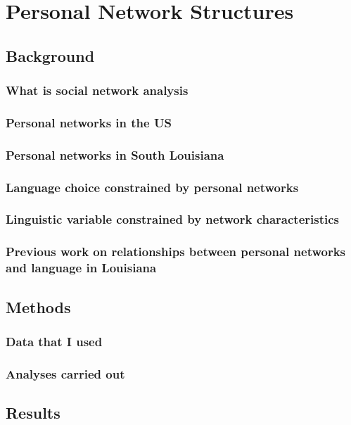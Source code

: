 \chapter{Personal Network Structures}
  \section{Background}
    \subsection{What is social network analysis}
    \subsection{Personal networks in the US}
    \subsection{Personal networks in South Louisiana}
    \subsection{Language choice constrained by personal networks}
    \subsection{Linguistic variable constrained by network characteristics}
    \subsection{Previous work on relationships between personal networks and language in Louisiana}
  \section{Methods}
    \subsection{Data that I used}
    \subsection{Analyses carried out}
  \section{Results}



